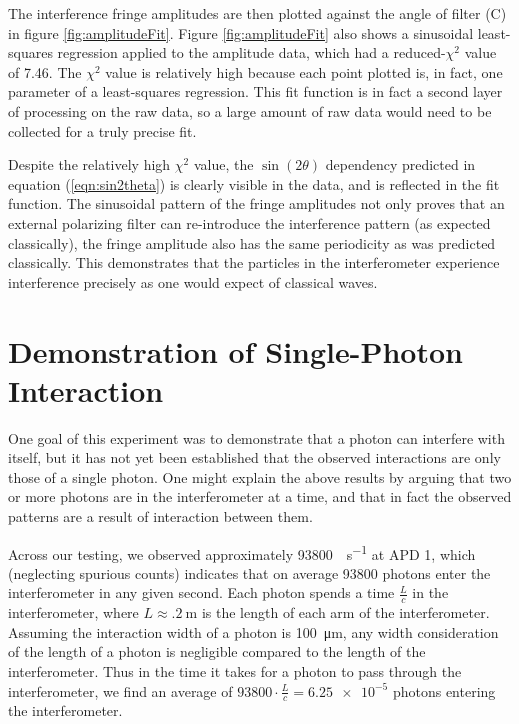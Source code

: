 \documentclass[letter]{article}
\begin{document}
The interference fringe amplitudes are then plotted against the angle of filter (C) in figure \ref{fig:amplitudeFit}. Figure \ref{fig:amplitudeFit} also shows a sinusoidal least-squares regression applied to the amplitude data, which had a reduced-$\chi^2$ value of 7.46. The $\chi^2$ value is relatively high because each point plotted is, in fact, one parameter of a least-squares regression. This fit function is in fact a second layer of processing on the raw data, so a large amount of raw data would need to be collected for a truly precise fit. 

Despite the relatively high $\chi^2$ value, the $\sin(2\theta)$ dependency predicted in equation (\ref{eqn:sin2theta}) is clearly visible in the data, and is reflected in the fit function. The sinusoidal pattern of the fringe amplitudes not only proves that an external polarizing filter can re-introduce the interference pattern (as expected classically), the fringe amplitude also has the same periodicity as was predicted classically. This demonstrates that the particles in the interferometer experience interference precisely as one would expect of classical waves.


\section{Demonstration of Single-Photon Interaction}

One goal of this experiment was to demonstrate that a photon can interfere with itself, but it has not yet been established that the observed interactions are only those of a single photon. One might explain the above results by arguing that two or more photons are in the interferometer at a time, and that in fact the observed patterns are a result of interaction between them. 

Across our testing, we observed approximately \qty{93800}{\count\per\s} at APD 1, which (neglecting spurious counts) indicates that on average \num{93800} photons enter the interferometer in any given second. Each photon spends a time $\frac{L}{c}$ in the interferometer, where $L \approx \qty{.2}{\m}$ is the length of each arm of the interferometer. Assuming the interaction width of a photon is \qty{100}{\micro\m}, any width consideration of the length of a photon is negligible compared to the length of the interferometer. Thus in the time it takes for a photon to pass through the interferometer, we find an average of ${\num{93800} \cdot \frac{L}{c} = \num{6.25e-5}}$ photons entering the interferometer.
\end{document}
